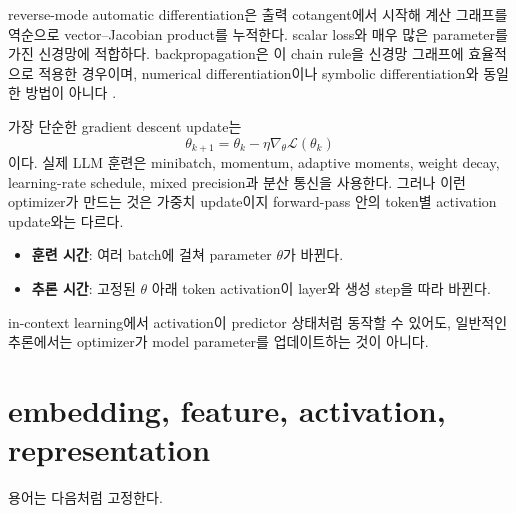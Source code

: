 reverse-mode automatic differentiation은 출력 cotangent에서 시작해 계산 그래프를 역순으로 vector--Jacobian product를 누적한다.
scalar loss와 매우 많은 parameter를 가진 신경망에 적합하다.
backpropagation은 이 chain rule을 신경망 그래프에 효율적으로 적용한 경우이며, numerical differentiation이나 symbolic differentiation와 동일한 방법이 아니다 \citep{rumelhart1986backprop,baydin2018autodiff}.

가장 단순한 gradient descent update는
\begin{equation}
  \theta_{k+1}=\theta_k-\eta\nabla_{\theta}\mathcal{L}(\theta_k)
\end{equation}
이다.
실제 LLM 훈련은 minibatch, momentum, adaptive moments, weight decay, learning-rate schedule, mixed precision과 분산 통신을 사용한다.
그러나 이런 optimizer가 만드는 것은 가중치 update이지 forward-pass 안의 token별 activation update와는 다르다.

\begin{studybox}
\begin{itemize}
  \item \textbf{훈련 시간}: 여러 batch에 걸쳐 parameter $\theta$가 바뀐다.
  \item \textbf{추론 시간}: 고정된 $\theta$ 아래 token activation이 layer와 생성 step을 따라 바뀐다.
\end{itemize}
in-context learning에서 activation이 predictor 상태처럼 동작할 수 있어도, 일반적인 추론에서는 optimizer가 model parameter를 업데이트하는 것이 아니다.
\end{studybox}

\section{embedding, feature, activation, representation}

용어는 다음처럼 고정한다.

